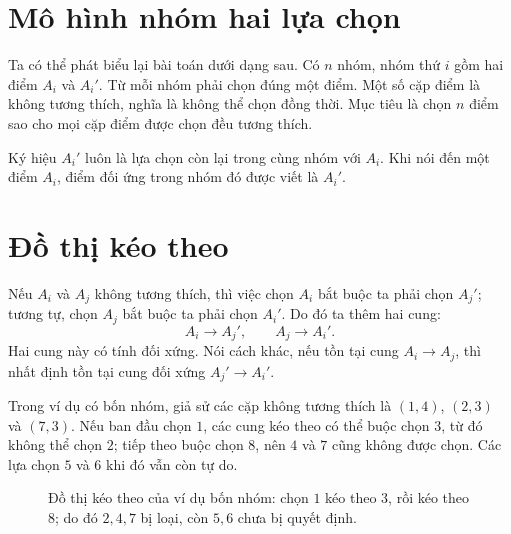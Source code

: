 \documentclass[11pt]{article}
\begin{document}
\section{Mô hình nhóm hai lựa chọn}

Ta có thể phát biểu lại bài toán dưới dạng sau. Có $n$ nhóm, nhóm thứ
$i$ gồm hai điểm $A_i$ và $A_i'$. Từ mỗi nhóm phải chọn đúng một điểm.
Một số cặp điểm là không tương thích, nghĩa là không thể chọn đồng thời.
Mục tiêu là chọn $n$ điểm sao cho mọi cặp điểm được chọn đều tương thích.

Ký hiệu $A_i'$ luôn là lựa chọn còn lại trong cùng nhóm với $A_i$. Khi
nói đến một điểm $A_i$, điểm đối ứng trong nhóm đó được viết là $A_i'$.

\section{Đồ thị kéo theo}

Nếu $A_i$ và $A_j$ không tương thích, thì việc chọn $A_i$ bắt buộc ta
phải chọn $A_j'$; tương tự, chọn $A_j$ bắt buộc ta phải chọn $A_i'$.
Do đó ta thêm hai cung:
\[
  A_i \to A_j', \qquad A_j \to A_i'.
\]
Hai cung này có tính đối xứng. Nói cách khác, nếu tồn tại cung
$A_i \to A_j$, thì nhất định tồn tại cung đối xứng
$A_j' \to A_i'$.

Trong ví dụ có bốn nhóm, giả sử các cặp không tương thích là
$(1,4)$, $(2,3)$ và $(7,3)$. Nếu ban đầu chọn $1$, các cung kéo theo
có thể buộc chọn $3$, từ đó không thể chọn $2$; tiếp theo buộc chọn
$8$, nên $4$ và $7$ cũng không được chọn. Các lựa chọn $5$ và $6$ khi
đó vẫn còn tự do.

\begin{figure}[ht]
\centering
{}
\caption{Đồ thị kéo theo của ví dụ bốn nhóm: chọn \(1\) kéo theo \(3\), rồi kéo theo \(8\); do đó \(2,4,7\) bị loại, còn \(5,6\) chưa bị quyết định.}
\end{figure}
\end{document}
